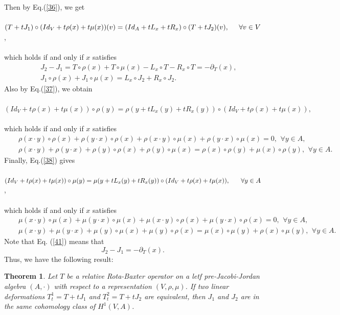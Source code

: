 \documentclass[12pt]{amsart}
\newtheorem{theorem}[Theorem]{Theorem}
\begin{document}
Then by Eq.(\ref{36}), we get \\\\
$(T+tJ_{1})\circ(Id_{V}+t\rho(x)+t\mu(x))(v)=(Id_{A}+tL_{x}+tR_x)\circ(T+tJ_{2})(v),\hspace*{0.5cm}\forall v\in V$,\\\\
which holds if and only if  $ x $ satisfies
\begin{eqnarray}
&&J_{2}-J_{1}=T\circ\rho(x)+T\circ\mu(x)-L_{x}\circ T-R_x\circ T=-\partial_T(x), \label{41}\\
&&J_{1}\circ\rho(x)+J_1\circ\mu(x)=L_{x}\circ J_{2}+R_x\circ J_2. \label{42}
\end{eqnarray}
Also by Eq.(\ref{37}), we obtain \\\\
$ (Id_{V}+t\rho(x)+t\mu(x))\circ\rho(y)=\rho(y+tL_{x}(y)+tR_x(y))\circ(Id_{V}+t\rho(x)+t\mu(x)), $\\\\
which holds if and only if $ x $ satisfies
\begin{eqnarray}
&&\rho(x\cdot y)\circ\rho(x)+\rho(y\cdot x)\circ\rho(x)+\rho(x\cdot y)\circ\mu(x)+\rho(y\cdot x)\circ\mu(x)=0, \,\ \forall y\in A,\label{43}\\
&&\rho(x\cdot y)+\rho(y\cdot x)+\rho(y)\circ \rho(x)+\rho(y)\circ \mu(x)=\rho(x)\circ \rho(y)+\mu(x)\circ \rho(y),\,\ \forall y\in A.\label{44}
\end{eqnarray}
Finally, Eq.(\ref{38}) gives \\\\
$ (Id_{V}+t\rho(x)+t\mu(x))\circ\mu(y)=\mu(y+tL_{x}(y)+tR_x(y))\circ(Id_{V}+t\rho(x)+t\mu(x)), \hspace*{0.6cm}\forall y\in A $,\\\\
which holds if and only if  $ x $ satisfies
\begin{eqnarray}
	&&\mu(x\cdot y)\circ\mu(x)+\mu(y\cdot x)\circ\mu(x)+\mu(x\cdot y)\circ\rho(x)+\mu(y\cdot x)\circ\rho(x)=0, \,\ \forall y\in A,\label{45}\\
	&&\mu(x\cdot y)+\mu(y\cdot x)+\mu(y)\circ \mu(x)+\mu(y)\circ \rho(x)=\mu(x)\circ \mu(y)+\rho(x)\circ \mu(y),\,\ \forall y\in A.\label{46}
\end{eqnarray}
Note that Eq. (\ref{41}) means that $$J_{2}-J_{1}=-\partial_T(x).$$ Thus, we have the following result:
\begin{theorem}
Let $T$ be a relative Rota-Baxter operator on  a letf pre-Jacobi-Jordan algebra $(A,\cdot)$ with
respect to a representation $(V,\rho,\mu)$. If two linear deformations $T_{t}^1 = T +tJ_1$ and $T_{t}^2= T +tJ_2$ are equivalent, then $J_1$ and $J_2$ are in the same cohomology class of $H^1 (V,A)$.	
\end{theorem}
\end{document}
